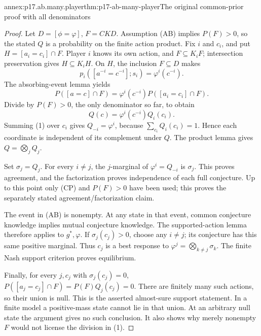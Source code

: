 \begin{annexitem}{annex:p17.ab.many.player}{thm:p17-ab-many-player}{The original common-prior proof with all denominators}
\begin{proof}
Let \(D=[\phi=\varphi]\), \(F=CKD\). Assumption (AB) implies
\(P(F)>0\), so the stated \(Q\) is a probability on the finite
action product. Fix \(i\) and \(c_i\), and put
\(H=[a_i=c_i]\cap F\).
Player \(i\) knows its own action, and \(F\subseteq K_iF\);
intersection preservation gives \(H\subseteq K_iH\).
On \(H\), the inclusion \(F\subseteq D\) makes
\[
 p_i([a^{-i}=c^{-i}];s_i)=\varphi^i(c^{-i}).
\]
The absorbing-event lemma yields
\[
 P([a=c]\cap F)=\varphi^i(c^{-i})P([a_i=c_i]\cap F).
\]
Divide by \(P(F)>0\), the only denominator so far, to obtain
\[
                   Q(c)=\varphi^i(c^{-i})Q_i(c_i).
 \tag{1}
\]
Summing (1) over \(c_i\) gives \(Q_{-i}=\varphi^i\), because
\(\sum_{c_i}Q_i(c_i)=1\). Hence each coordinate is independent
of its complement under \(Q\). The product lemma gives
\(Q=\bigotimes_jQ_j\).

Set \(\sigma_j=Q_j\). For every \(i\ne j\), the \(j\)-marginal
of \(\varphi^i=Q_{-i}\) is \(\sigma_j\). This proves agreement,
and the factorization proves independence of each full conjecture.
Up to this point only (CP) and \(P(F)>0\) have been used;
this proves the separately stated agreement/factorization claim.

The event in (AB) is nonempty. At any state in that event, common
conjecture knowledge implies mutual conjecture knowledge.
The supported-action lemma therefore applies to \(g^*,\varphi\).
If \(\sigma_j(c_j)>0\), choose any \(i\ne j\); its conjecture
has this same positive marginal. Thus \(c_j\) is a best response
to \(\varphi^j=\bigotimes_{k\ne j}\sigma_k\).
The finite Nash support criterion proves equilibrium.

Finally, for every \(j,c_j\) with \(\sigma_j(c_j)=0\),
\(P([a_j=c_j]\cap F)=P(F)Q_j(c_j)=0\).
There are finitely many such actions, so their union is null.
This is the asserted almost-sure support statement. In a finite
model a positive-mass state cannot lie in that union. At an
arbitrary null state the argument gives no such conclusion.
It also shows why merely nonempty \(F\) would not license
the division in (1).
\end{proof}
\end{annexitem}

